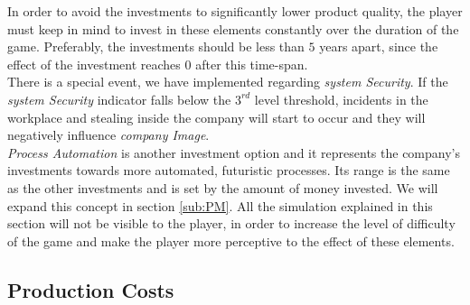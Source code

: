 \begin{figure}[ht]
\centering
{}
	\label{fig:InvestmentGraph}
\end{figure}


In order to avoid the investments to significantly lower product quality, the player must keep in mind to invest in these elements constantly over the duration of the game. Preferably, the investments should be less than $5$ years apart, since the effect of the investment reaches $0$ after this time-span.\\
There is a special event, we have implemented regarding \textit{system Security}.
If the \textit{system Security} indicator falls below the $3^{rd}$ level threshold, incidents in the workplace and stealing inside the company will start to occur and they will negatively influence \textit{company Image}. \\
\textit{Process Automation} is another investment option and it represents the company's investments towards more automated, futuristic processes. Its range is the same as the other investments and is set by the amount of money invested. We will expand this concept in section \ref{sub:PM}.
All the simulation explained in this section will not be visible to the player, in order to increase the level of difficulty of the game and make the player more perceptive to the effect of these elements. 


\subsection{Production Costs}
\label{prodCosts_simulation}

